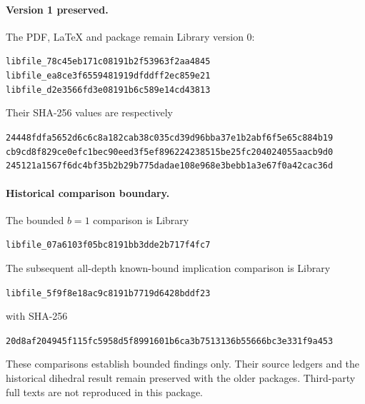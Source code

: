 \documentclass[11pt,letterpaper]{article}
\theoremstyle{definition}\newtheorem{definition}{Definition}
\newcommand{\hash}[1]{{\small\ttfamily\nolinkurl{#1}}}
\begin{document}
\paragraph{Version 1 preserved.}
The PDF, LaTeX and package remain Library version $0$:
\begin{center}\hash{libfile_78c45eb171c08191b2f53963f2aa4845}\\[3pt]
\hash{libfile_ea8ce3f6559481919dfddff2ec859e21}\\[3pt]
\hash{libfile_d2e3566fd3e08191b6c589e14cd43813}\end{center}
Their SHA-256 values are respectively
\begin{center}\hash{24448fdfa5652d6c6c8a182cab38c035cd39d96bba37e1b2abf6f5e65c884b19}\\[3pt]
\hash{cb9cd8f829ce0efc1bec90eed3f5ef896224238515be25fc204024055aacb9d0}\\[3pt]
\hash{245121a1567f6dc4bf35b2b29b775dadae108e968e3bebb1a3e67f0a42cac36d}\end{center}

\paragraph{Historical comparison boundary.}
The bounded $b=1$ comparison is Library
\begin{center}\hash{libfile_07a6103f05bc8191bb3dde2b717f4fc7}\end{center}
The subsequent all-depth known-bound implication comparison is Library
\begin{center}\hash{libfile_5f9f8e18ac9c8191b7719d6428bddf23}\end{center}
with SHA-256
\begin{center}\hash{20d8af204945f115fc5958d5f8991601b6ca3b7513136b55666bc3e331f9a453}\end{center}
These comparisons establish bounded findings only. Their source ledgers and the historical dihedral result remain preserved with the older packages. Third-party full texts are not reproduced in this package.
\end{document}
